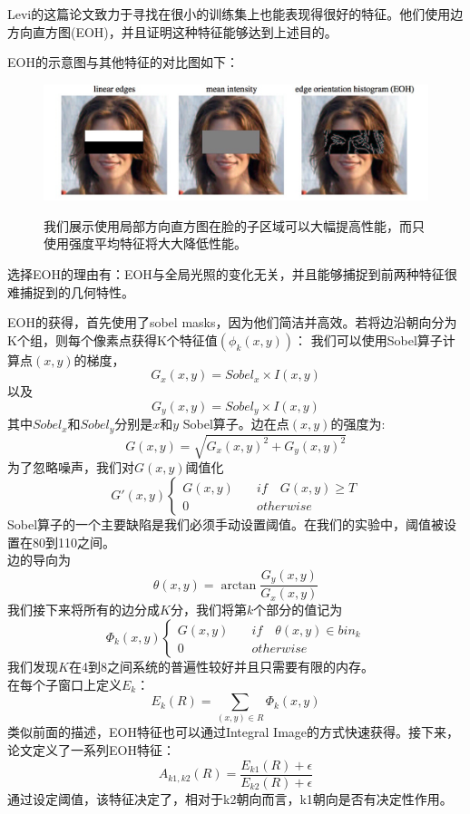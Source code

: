 \begin{enumerate}
Levi的这篇论文致力于寻找在很小的训练集上也能表现得很好的特征。他们使用边方向直方图(EOH)，并且证明这种特征能够达到上述目的。

EOH的示意图与其他特征的对比图如下：
\begin{figure}[H]
    \centering 
    \includegraphics[width=1\textwidth]{image/2_1_4_4.jpg}    
    \label{logic}
    \caption{我们展示使用局部方向直方图在脸的子区域可以大幅提高性能，而只使用强度平均特征将大大降低性能。}
\end{figure}
选择EOH的理由有：EOH与全局光照的变化无关，并且能够捕捉到前两种特征很难捕捉到的几何特性。

EOH的获得，首先使用了sobel masks，因为他们简洁并高效。若将边沿朝向分为K个组，则每个像素点获得K个特征值$(\phi_k(x, y))$：
我们可以使用Sobel算子计算点$(x,y)$的梯度，
$$G_x(x,y)=Sobel_x\times I(x,y)$$
以及
$$G_y(x,y)=Sobel_y\times I(x,y)$$
其中$Sobel_x$和$Sobel_y$分别是$x$和$y$ Sobel算子。边在点$(x,y)$的强度为:
$$G(x,y)=\sqrt{G_x(x,y)^2+G_y(x,y)^2}$$
为了忽略噪声，我们对$G(x,y)$阈值化
$$G'(x,y)\left\{
\begin{aligned}
G(x,y) & \quad if \quad G(x,y)\geq T \\
0 & \quad otherwise
\end{aligned}
\right.
$$
Sobel算子的一个主要缺陷是我们必须手动设置阈值。在我们的实验中，阈值被设置在80到110之间。\\
边的导向为
$$\theta(x,y)=\arctan{\frac{G_y(x,y)}{G_x(x,y)}}$$
我们接下来将所有的边分成$K$分，我们将第$k$个部分的值记为
$$\Phi_k(x,y)\left\{
\begin{aligned}
G(x,y) & \quad if\quad \theta(x,y)\in bin_k \\
0 & \quad otherwise
\end{aligned}
\right.
$$
我们发现$K$在4到8之间系统的普遍性较好并且只需要有限的内存。\\
在每个子窗口上定义$E_k$：
$$E_k(R)=\sum_{(x,y)\in R}\Phi_k(x,y)$$
类似前面的描述，EOH特征也可以通过Integral Image的方式快速获得。接下来，论文定义了一系列EOH特征：
$$A_{k1,k2}(R)=\frac{E_{k1}(R)+\epsilon}{E_{k2}(R)+\epsilon}$$
通过设定阈值，该特征决定了，相对于k2朝向而言，k1朝向是否有决定性作用。


\end{enumerate}

